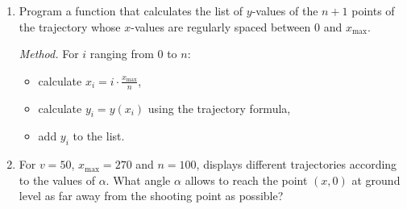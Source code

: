 \documentclass[11pt,class=report,crop=false]{standalone}
\begin{document}
\begin{activite}[Ballistics]
\begin{enumerate}
  \item Program a function  that calculates the list of $y$-values of the $n+1$ points of the trajectory whose $x$-values are regularly spaced between $0$ and $x_{\max}$. 
  
  \emph{Method.} For $i$ ranging from $0$ to $n$:
  \begin{itemize}
    \item calculate $x_i = i \cdot \frac{x_{\max}}{n}$,    
    \item calculate $y_i = y(x_i)$ using the trajectory formula,
    \item add $y_i$ to the list.
  \end{itemize}  
  
  
  \item For $v=50$, $x_{\max} = 270$ and $n=100$, displays different trajectories according to the values of $\alpha$. What angle $\alpha$ allows to reach the point $(x,0)$ at ground level as far away from the shooting point as possible?
  
  
\end{enumerate}

\end{activite}
\end{document}
